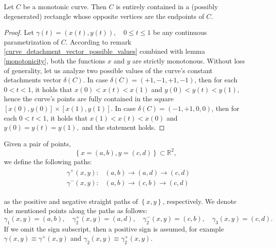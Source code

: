 \documentclass[11pt]{book}
\begin{document}
\begin{corollary}\label{corollary_about_detachment_vector}Let $C$ be a monotonic curve. Then $C$ is entirely contained in a (possibly degenerated) rectangle whose opposite vertices are the endpoints of $C$.
\end{corollary}
\begin{proof}Let $\gamma\left(t\right)=\left(x\left(t\right),y\left(t\right)\right),\quad 0\leq t\leq 1$ be any continuous parametrization of $C.$
According to remark \ref{curve_detachment_vector_possible_values} combined with lemma \ref{monotonicity}, both the functions $x$ and $y$ are strictly monotonous. Without loss of generality, let us analyze two possible values of the curve’s constant detachments vector $\delta\left(C\right).$
In case $\delta\left( C \right) = \left( +1,-1,+1,-1 \right)$, then for each $0<t<1$, it holds that $x\left(0\right)< x\left(t\right)<x\left(1\right)$ and $y\left(0\right)<y\left(t\right)<y\left(1\right),$
hence the curve’s points are fully contained in the square $\left[x\left(0\right),y\left(0\right)\right]\times\left[x\left(1\right),y\left(1\right)\right].$
In case $\delta\left(C\right) = \left(-1,+1,0,0\right)$, then for each $0< t <1$, it holds that $x\left(1\right)< x\left(t\right)< x\left(0\right)$ and $y\left(0\right) =y\left(t\right) =y\left(1\right),$ and the statement holds.
\end{proof}

\begin{definition}
Given a pair of points,
$$\left\{x=\left(a,b\right), y=\left(c,d\right)\right\}\subset \mathbb{R}^2,$$
we define the following paths:
\begin{align}
\begin{aligned}
 & \gamma^{+}\left(x,y\right): & \left(a,b\right)\longrightarrow\left(a,d\right)\longrightarrow\left(c,d\right)\\
 & \gamma^{-}\left(x,y\right): & \left(a,b\right)\longrightarrow\left(c,b\right)\longrightarrow\left(c,d\right)
\end{aligned}
\end{align}

as the positive and negative straight paths of $\left\{x,y\right\}$, respectively. We denote the mentioned points along the paths as follows:
$$\gamma_1\left(x,y\right) = \left(a,b\right),\quad \gamma^+_2\left(x,y\right) = \left(a,d\right),\quad \gamma^-_2\left(x,y\right) = \left(c,b\right),\quad \gamma_3\left(x,y\right) = \left(c,d\right).$$
If we omit the sign subscript, then a positive sign is assumed, for example $\gamma\left(x,y\right)\equiv\gamma^+\left(x,y\right)$ and $\gamma_2\left(x,y\right)\equiv\gamma^+_2\left(x,y\right).$
\label{straight_path_points_pair}
\end{definition}
\end{document}

